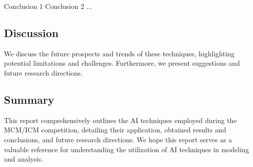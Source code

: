 \documentclass{mcmthesis}
\begin{document}
Conclusion 1
Conclusion 2
...

\subsection*{Discussion}

We discuss the future prospects and trends of these techniques, highlighting potential limitations and challenges. Furthermore, we present suggestions and future research directions.

\subsection*{Summary}

This report comprehensively outlines the AI techniques employed during the MCM/ICM competition, detailing their application, obtained results and conclusions, and future research directions. We hope this report serves as a valuable reference for understanding the utilization of AI techniques in modeling and analysis.

\clearpage
\setcounter{page}{\value{lastpage}}
\end{document}
